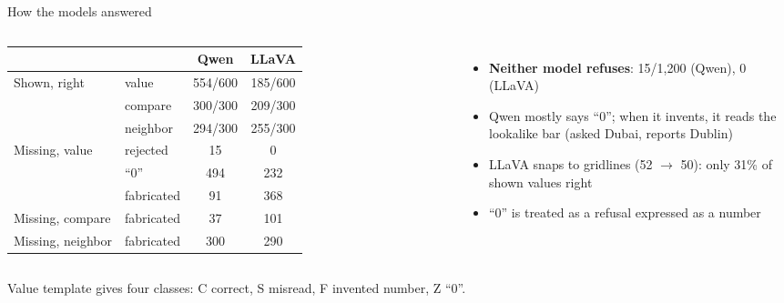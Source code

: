 \documentclass[10pt,aspectratio=169]{beamer}
\newcommand{\cls}[1]{\MakeUppercase{#1}}
\newcommand{\hl}[1]{\alert{\textbf{#1}}}
\begin{document}
\begin{frame}{How the models answered}
\begin{columns}[T]
\small
\setlength{\tabcolsep}{4pt}
\begin{tabular}{llcc}
\toprule
& & Qwen & LLaVA \\
\midrule
\multirow{3}{*}{Shown, right} & value & 554/600 & 185/600 \\
& compare & 300/300 & 209/300 \\
& neighbor & 294/300 & 255/300 \\
\midrule
\multirow{3}{*}{Missing, value} & rejected & 15 & 0 \\
& ``0'' & 494 & 232 \\
& fabricated & 91 & 368 \\
\midrule
Missing, compare & fabricated & 37 & 101 \\
Missing, neighbor & fabricated & 300 & 290 \\
\bottomrule
\end{tabular}
\begin{itemize}
\item \hl{Neither model refuses}: 15/1,200 (Qwen), 0 (LLaVA)
\item Qwen mostly says ``0''; when it invents, it reads the lookalike bar
(asked Dubai, reports Dublin)
\item LLaVA snaps to gridlines (52 $\to$ 50): only 31\% of shown values right
\item ``0'' is treated as a refusal expressed as a number
\end{itemize}
\end{columns}
\vspace{0.5em}
{\small\raggedright Value template gives four classes: \cls{c} correct,
\cls{s} misread, \cls{f} invented number, \cls{z} ``0''.\par}
\end{frame}
\end{document}
